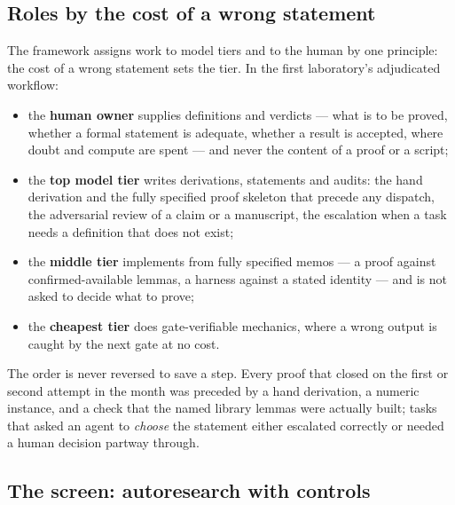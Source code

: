 \documentclass[11pt]{article}
\begin{document}
\subsection{Roles by the cost of a wrong statement}

The framework assigns work to model tiers and to the human by one principle: the cost of a
wrong statement sets the tier. In the first laboratory's adjudicated workflow:

\begin{itemize}[leftmargin=*,itemsep=1pt]
\item the \textbf{human owner} supplies definitions and verdicts --- what is to be proved,
  whether a formal statement is adequate, whether a result is accepted, where doubt and compute
  are spent --- and never the content of a proof or a script;
\item the \textbf{top model tier} writes derivations, statements and audits: the hand
  derivation and the fully specified proof skeleton that precede any dispatch, the adversarial
  review of a claim or a manuscript, the escalation when a task needs a definition that does
  not exist;
\item the \textbf{middle tier} implements from fully specified memos --- a proof against
  confirmed-available lemmas, a harness against a stated identity --- and is not asked to
  decide what to prove;
\item the \textbf{cheapest tier} does gate-verifiable mechanics, where a wrong output is caught
  by the next gate at no cost.
\end{itemize}
The order is never reversed to save a step. Every proof that closed on the first or second
attempt in the month was preceded by a hand derivation, a numeric instance, and a check that the
named library lemmas were actually built; tasks that asked an agent to \emph{choose} the
statement either escalated correctly or needed a human decision partway through.

\subsection{The screen: autoresearch with controls}
\end{document}
